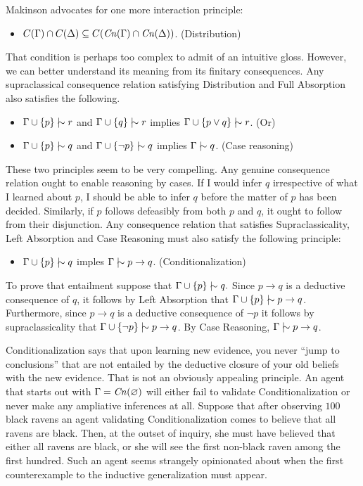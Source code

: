 Makinson advocates for one more interaction principle:
\begin{itemize}
\item[] $C(\Gamma) \cap C(\Delta) \subseteq C(\text{\textit{Cn}}(\Gamma) \cap \text{\textit{Cn}}(\Delta))$.
\hfill(Distribution)
\end{itemize}
That condition is perhaps too complex to admit of an intuitive gloss. However,
we can better understand its meaning from its finitary consequences. Any
supraclassical consequence relation satisfying Distribution and Full Absorption
also satisfies the following.
\begin{itemize}
\item[] $\Gamma \cup \{p\} \mathrel{\mid\hspace{-.08em}\!\sim} r$ and $\Gamma \cup \{q\} \mathrel{\mid\hspace{-.08em}\!\sim} r$ implies $\Gamma
\cup \{ p \vee q \}\mathrel{\mid\hspace{-.08em}\!\sim} r$. \hfill (Or)
\item[] $\Gamma \cup \{p\} \mathrel{\mid\hspace{-.08em}\!\sim} q$ and $\Gamma \cup \{\neg p\} \mathrel{\mid\hspace{-.08em}\!\sim} q$ implies
$\Gamma \mathrel{\mid\hspace{-.08em}\!\sim} q$. \hfill(Case reasoning)
\end{itemize}
These two principles seem to be very compelling. Any genuine consequence
relation ought to enable reasoning by cases. If I would infer $q$ irrespective
of what I learned about  $p$, I should be able to infer $q$ before the matter of
$p$ has been decided. Similarly, if $p$ follows defeasibly from both $p$ and
$q$, it ought to follow from their disjunction. Any consequence relation that
satisfies Supraclassicality, Left Absorption and Case Reasoning must also
satisfy the following principle:
\begin{itemize}
\item[] $\Gamma \cup \{p\} \mathrel{\mid\hspace{-.08em}\!\sim} q$ imples $\Gamma \mathrel{\mid\hspace{-.08em}\!\sim} p \rightarrow q$.
\hfill(Conditionalization)
\end{itemize}
To prove that entailment suppose that $\Gamma \cup \{p\} \mathrel{\mid\hspace{-.08em}\!\sim} q.$ Since
$p\rightarrow q$ is a deductive consequence of $q$, it follows by Left
Absorption that $\Gamma \cup \{ p \} \mathrel{\mid\hspace{-.08em}\!\sim} p \rightarrow q$. Furthermore, since
$p\rightarrow q$ is a deductive consequence of $\neg p$ it follows by
supraclassicality that $\Gamma \cup \{ \neg p \} \mathrel{\mid\hspace{-.08em}\!\sim} p \rightarrow q$. By Case
Reasoning, $\Gamma \mathrel{\mid\hspace{-.08em}\!\sim} p \rightarrow q$.

Conditionalization says that upon learning new evidence, you never ``jump to
conclusions'' that are not entailed by the deductive closure of your old beliefs
with the new evidence. That is not an obviously appealing principle. An agent
that  starts out with $\Gamma = \text{\textit{Cn}}(\varnothing)$ will either fail to validate
Conditionalization or never make any ampliative inferences at all. Suppose that
after observing $100$ black ravens an agent validating Conditionalization comes
to believe that all ravens are black. Then, at the outset of inquiry, she must
have believed that either all ravens are black, or she will see the first
non-black raven among the first hundred. Such an agent seems strangely
opinionated about when the first counterexample to the inductive generalization
must appear.

